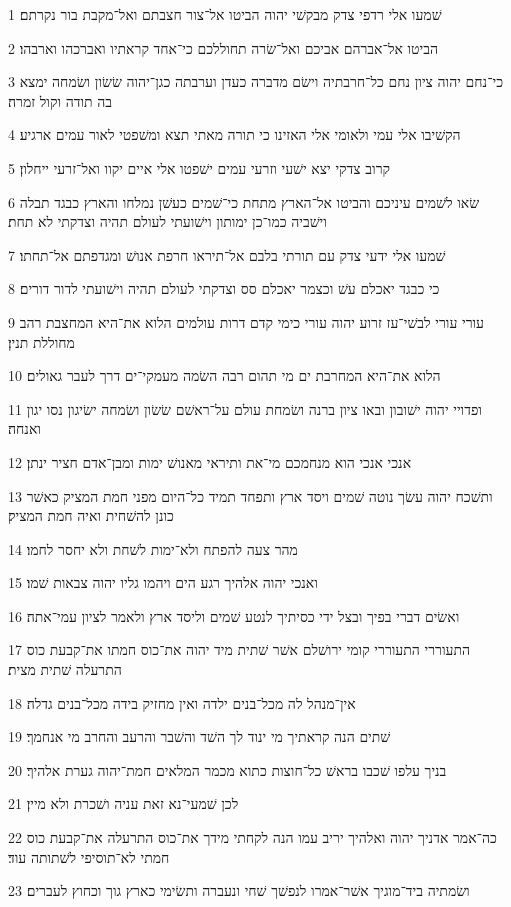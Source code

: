 \par 1 שׁמעו אלי רדפי צדק מבקשׁי יהוה הביטו אל־צור חצבתם ואל־מקבת בור נקרתם׃
\par 2 הביטו אל־אברהם אביכם ואל־שׂרה תחוללכם כי־אחד קראתיו ואברכהו וארבהו׃
\par 3 כי־נחם יהוה ציון נחם כל־חרבתיה וישׂם מדברה כעדן וערבתה כגן־יהוה שׂשׂון ושׂמחה ימצא בה תודה וקול זמרה׃
\par 4 הקשׁיבו אלי עמי ולאומי אלי האזינו כי תורה מאתי תצא ומשׁפטי לאור עמים ארגיע׃
\par 5 קרוב צדקי יצא ישׁעי וזרעי עמים ישׁפטו אלי איים יקוו ואל־זרעי ייחלון׃
\par 6 שׂאו לשׁמים עיניכם והביטו אל־הארץ מתחת כי־שׁמים כעשׁן נמלחו והארץ כבגד תבלה וישׁביה כמו־כן ימותון וישׁועתי לעולם תהיה וצדקתי לא תחת׃
\par 7 שׁמעו אלי ידעי צדק עם תורתי בלבם אל־תיראו חרפת אנושׁ ומגדפתם אל־תחתו׃
\par 8 כי כבגד יאכלם עשׁ וכצמר יאכלם סס וצדקתי לעולם תהיה וישׁועתי לדור דורים׃
\par 9 עורי עורי לבשׁי־עז זרוע יהוה עורי כימי קדם דרות עולמים הלוא את־היא המחצבת רהב מחוללת תנין׃
\par 10 הלוא את־היא המחרבת ים מי תהום רבה השׂמה מעמקי־ים דרך לעבר גאולים׃
\par 11 ופדויי יהוה ישׁובון ובאו ציון ברנה ושׂמחת עולם על־ראשׁם שׂשׂון ושׂמחה ישׂיגון נסו יגון ואנחה׃
\par 12 אנכי אנכי הוא מנחמכם מי־את ותיראי מאנושׁ ימות ומבן־אדם חציר ינתן׃
\par 13 ותשׁכח יהוה עשׂך נוטה שׁמים ויסד ארץ ותפחד תמיד כל־היום מפני חמת המציק כאשׁר כונן להשׁחית ואיה חמת המציק׃
\par 14 מהר צעה להפתח ולא־ימות לשׁחת ולא יחסר לחמו׃
\par 15 ואנכי יהוה אלהיך רגע הים ויהמו גליו יהוה צבאות שׁמו׃
\par 16 ואשׂים דברי בפיך ובצל ידי כסיתיך לנטע שׁמים וליסד ארץ ולאמר לציון עמי־אתה׃
\par 17 התעוררי התעוררי קומי ירושׁלם אשׁר שׁתית מיד יהוה את־כוס חמתו את־קבעת כוס התרעלה שׁתית מצית׃
\par 18 אין־מנהל לה מכל־בנים ילדה ואין מחזיק בידה מכל־בנים גדלה׃
\par 19 שׁתים הנה קראתיך מי ינוד לך השׁד והשׁבר והרעב והחרב מי אנחמך׃
\par 20 בניך עלפו שׁכבו בראשׁ כל־חוצות כתוא מכמר המלאים חמת־יהוה גערת אלהיך׃
\par 21 לכן שׁמעי־נא זאת עניה ושׁכרת ולא מיין׃
\par 22 כה־אמר אדניך יהוה ואלהיך יריב עמו הנה לקחתי מידך את־כוס התרעלה את־קבעת כוס חמתי לא־תוסיפי לשׁתותה עוד׃
\par 23 ושׂמתיה ביד־מוגיך אשׁר־אמרו לנפשׁך שׁחי ונעברה ותשׂימי כארץ גוך וכחוץ לעברים׃

